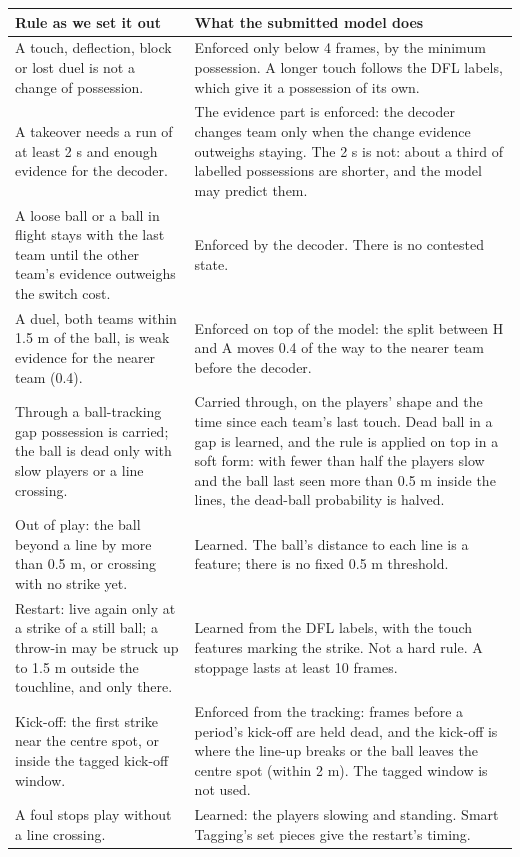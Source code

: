 \documentclass[10pt,a4paper]{article}
\begin{document}
{\footnotesize
\begin{longtable}{>{\raggedright\arraybackslash}p{}>{\raggedright\arraybackslash}p{}}
\toprule
{}\textbf{Rule as we set it out} & {}\textbf{What the submitted model does} \\
\midrule
\endhead
{}A touch, deflection, block or lost duel is not a change of possession. & {}Enforced only below 4 frames, by the minimum possession. A longer touch follows the DFL labels, which give it a possession of its own. \\
\addlinespace[3pt]
{}A takeover needs a run of at least 2 s and enough evidence for the decoder. & {}The evidence part is enforced: the decoder changes team only when the change evidence outweighs staying. The 2 s is not: about a third of labelled possessions are shorter, and the model may predict them. \\
\addlinespace[3pt]
{}A loose ball or a ball in flight stays with the last team until the other team's evidence outweighs the switch cost. & {}Enforced by the decoder. There is no contested state. \\
\addlinespace[3pt]
{}A duel, both teams within 1.5 m of the ball, is weak evidence for the nearer team (0.4). & {}Enforced on top of the model: the split between H and A moves 0.4 of the way to the nearer team before the decoder. \\
\addlinespace[3pt]
{}Through a ball-tracking gap possession is carried; the ball is dead only with slow players or a line crossing. & {}Carried through, on the players' shape and the time since each team's last touch. Dead ball in a gap is learned, and the rule is applied on top in a soft form: with fewer than half the players slow and the ball last seen more than 0.5 m inside the lines, the dead-ball probability is halved. \\
\addlinespace[3pt]
{}Out of play: the ball beyond a line by more than 0.5 m, or crossing with no strike yet. & {}Learned. The ball's distance to each line is a feature; there is no fixed 0.5 m threshold. \\
\addlinespace[3pt]
{}Restart: live again only at a strike of a still ball; a throw-in may be struck up to 1.5 m outside the touchline, and only there. & {}Learned from the DFL labels, with the touch features marking the strike. Not a hard rule. A stoppage lasts at least 10 frames. \\
\addlinespace[3pt]
{}Kick-off: the first strike near the centre spot, or inside the tagged kick-off window. & {}Enforced from the tracking: frames before a period's kick-off are held dead, and the kick-off is where the line-up breaks or the ball leaves the centre spot (within 2 m). The tagged window is not used. \\
\addlinespace[3pt]
{}A foul stops play without a line crossing. & {}Learned: the players slowing and standing. Smart Tagging's set pieces give the restart's timing. \\
\bottomrule
\end{longtable}
}
\end{document}
